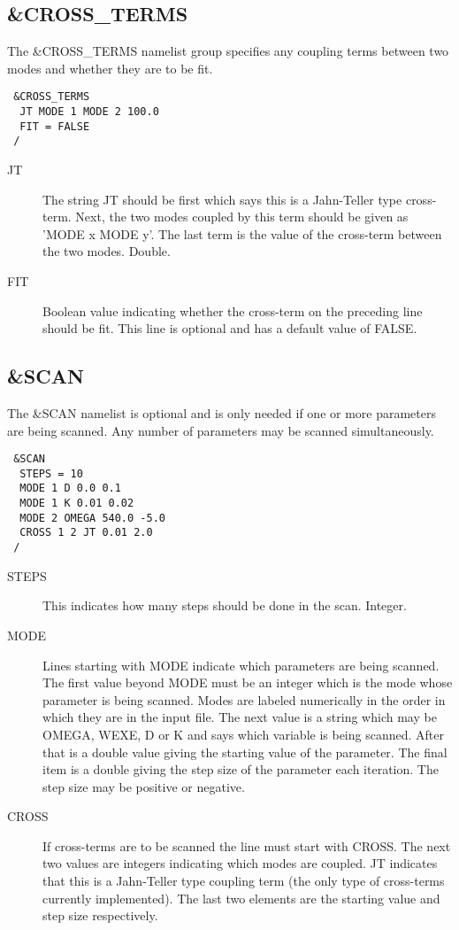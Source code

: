 \documentclass{article}
\begin{document}
\subsection{\&CROSS\_TERMS} The \&CROSS\_TERMS namelist group specifies
any coupling terms between two modes and whether they are to be fit.

\begin{verbatim}
 &CROSS_TERMS
  JT MODE 1 MODE 2 100.0
  FIT = FALSE
 /
\end{verbatim}

\begin{description}
\item[JT] The string JT should be first which says this is a Jahn-Teller type cross-term.
Next, the two modes coupled by this term should be given as 'MODE x MODE y'. 
The last term is the value of the cross-term between the two modes. Double.

\item[FIT] Boolean value indicating whether the cross-term on the preceding line
should be fit. This line is optional and has a default value of FALSE.

\end{description}

\subsection{\&SCAN} \label{scan}

The \&SCAN namelist is optional and is only needed if one or more parameters
are being scanned. Any number of parameters may be scanned simultaneously.

\begin{verbatim}
 &SCAN
  STEPS = 10
  MODE 1 D 0.0 0.1
  MODE 1 K 0.01 0.02
  MODE 2 OMEGA 540.0 -5.0
  CROSS 1 2 JT 0.01 2.0
 /
\end{verbatim}

\begin{description}
\item[STEPS] This indicates how many steps should be done in the scan.
Integer.

\item[MODE] Lines starting with MODE indicate which parameters are being 
scanned. The first value beyond MODE must be an integer which is the mode
whose parameter is being scanned. Modes are labeled numerically in the order
in which they are in the input file. The next value is a string which may be
OMEGA, WEXE, D or K and says which variable is being scanned. After that 
is a double value giving the starting value of the parameter. The final
item is a double giving the step size of the parameter each iteration. 
The step size may be positive or negative.

\item[CROSS] If cross-terms are to be scanned the line must start with 
CROSS. The next two values are integers indicating which modes are coupled.
JT indicates that this is a Jahn-Teller type coupling term (the only type
of cross-terms currently implemented). The last two elements are the starting
value and step size respectively.

\end{description}
\end{document}
